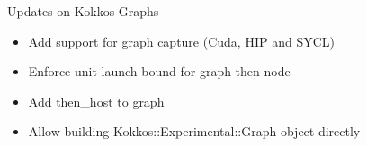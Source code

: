 \begin{frame}[fragile]{Updates on Kokkos Graphs}
 \begin{itemize}
     \item Add support for graph capture (Cuda, HIP and SYCL)
     \item Enforce unit launch bound for graph then node
     \item Add then\_host to graph
     \item Allow building Kokkos::Experimental::Graph object directly
 \end{itemize}
\end{frame}


%        



